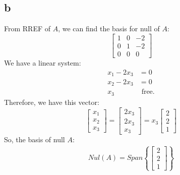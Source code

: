 \documentclass[10pt]{article}
\begin{document}
\subsection*{b}
\noindent From RREF of $A$, we can find the basis for null of $A$:
\begin{equation*}
    \begin{bmatrix}
        1 & 0 & -2 \\
        0 & 1 & -2 \\
        0 & 0 & 0 
    \end{bmatrix}
\end{equation*}
\noindent We have a linear system:
\begin{align*}
    x_1 - 2x_3 &= 0 \\
    x_2 - 2x_3 &= 0 \\
    x_3 &\text{ free.}
\end{align*}
\noindent Therefore, we have this vector:
\begin{equation*}
    \begin{bmatrix}
        x_1 \\
        x_2 \\
        x_3
    \end{bmatrix}
    =
    \begin{bmatrix}
        2x_3 \\
        2x_3 \\
        x_3
    \end{bmatrix}
    = x_3
    \begin{bmatrix}
        2 \\
        2 \\
        1
    \end{bmatrix}
\end{equation*}
\noindent So, the basis of null $A$:
\begin{align*}
    Nul(A) = Span\left\{
    \begin{bmatrix}
        2 \\
        2 \\
        1
    \end{bmatrix}
    \right\}
\end{align*}
\end{document}
